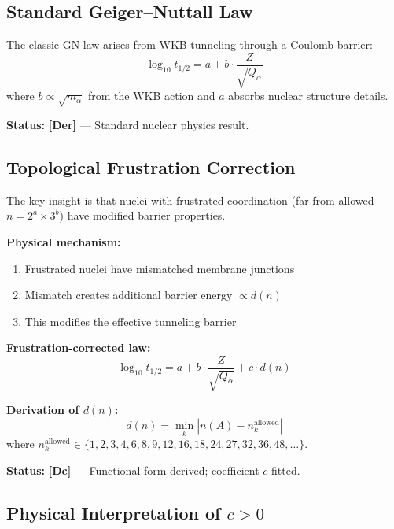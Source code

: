 \documentclass[11pt,a4paper]{article}
\newcommand{\tagDc}{\textcolor{blue!70!black}{\textbf{[Dc]}}}
\newcommand{\tagDer}{\textcolor{green!50!black}{\textbf{[Der]}}}
\begin{document}
\subsection{Standard Geiger--Nuttall Law}

The classic GN law arises from WKB tunneling through a Coulomb barrier:
\begin{equation}
    \log_{10} t_{1/2} = a + b \cdot \frac{Z}{\sqrt{Q_\alpha}}
\end{equation}
where $b \propto \sqrt{m_\alpha}$ from the WKB action and $a$ absorbs nuclear structure details.

\textbf{Status:} \tagDer{} --- Standard nuclear physics result.

\subsection{Topological Frustration Correction}

The key insight is that nuclei with frustrated coordination (far from allowed $n = 2^a \times 3^b$) have modified barrier properties.

\textbf{Physical mechanism:}
\begin{enumerate}
    \item Frustrated nuclei have mismatched membrane junctions
    \item Mismatch creates additional barrier energy $\propto d(n)$
    \item This modifies the effective tunneling barrier
\end{enumerate}

\textbf{Frustration-corrected law:}
\begin{equation}
    \log_{10} t_{1/2} = a + b \cdot \frac{Z}{\sqrt{Q_\alpha}} + c \cdot d(n)
\end{equation}

\textbf{Derivation of $d(n)$:}
\begin{equation}
    d(n) = \min_k \left| n(A) - n_k^{\text{allowed}} \right|
\end{equation}
where $n_k^{\text{allowed}} \in \{1, 2, 3, 4, 6, 8, 9, 12, 16, 18, 24, 27, 32, 36, 48, \ldots\}$.

\textbf{Status:} \tagDc{} --- Functional form derived; coefficient $c$ fitted.

\subsection{Physical Interpretation of $c > 0$}
\end{document}
